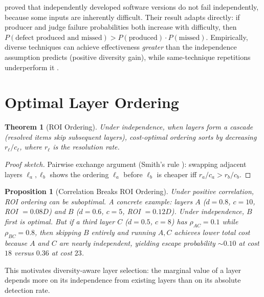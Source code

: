 \documentclass[11pt, a4paper, copyright]{googledeepmind}
\newtheorem{theorem}{Theorem}[section]
\newtheorem{proposition}{Proposition}[section]
\begin{document}
\citet{littlewood1993, littlewood2000} proved that independently developed software versions do not fail independently, because some inputs are inherently difficult. Their result adapts directly: if producer and judge failure probabilities both increase with difficulty, then $P(\text{defect produced and missed}) > P(\text{produced}) \cdot P(\text{missed})$. Empirically, diverse techniques can achieve effectiveness \emph{greater} than the independence assumption predicts (positive diversity gain), while same-technique repetitions underperform it \citep{littlewood2000}.


\section{Optimal Layer Ordering}
\label{sec:ordering}

\begin{theorem}[ROI Ordering]
\label{thm:ordering}
Under independence, when layers form a cascade (resolved items skip subsequent layers), cost-optimal ordering sorts by decreasing $r_\ell / c_\ell$, where $r_\ell$ is the resolution rate.
\end{theorem}

\begin{proof}[Proof sketch]
Pairwise exchange argument (Smith's rule \citep{smith1956}): swapping adjacent layers $\ell_a, \ell_b$ shows the ordering $\ell_a$ before $\ell_b$ is cheaper iff $r_a / c_a > r_b / c_b$.
\end{proof}

\begin{proposition}[Correlation Breaks ROI Ordering]
\label{prop:corrbreaks}
Under positive correlation, ROI ordering can be suboptimal. A concrete example: layers $A$ ($d=0.8$, $c=10$, ROI $= 0.08D$) and $B$ ($d=0.6$, $c=5$, ROI $= 0.12D$). Under independence, $B$ first is optimal. But if a third layer $C$ ($d=0.5$, $c=8$) has $\rho_{AC} = 0.1$ while $\rho_{BC} = 0.8$, then skipping $B$ entirely and running $A, C$ achieves lower total cost because $A$ and $C$ are nearly independent, yielding escape probability ${\sim}0.10$ at cost $18$ versus $0.36$ at cost $23$.
\end{proposition}

This motivates diversity-aware layer selection: the marginal value of a layer depends more on its independence from existing layers than on its absolute detection rate.
\end{document}
